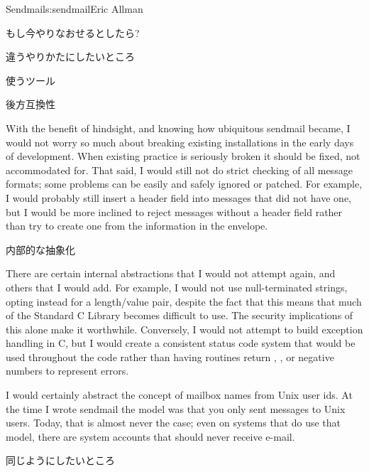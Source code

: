 \begin{aosachapter}{Sendmail}{s:sendmail}{Eric Allman}
\begin{aosasect1}{もし今やりなおせるとしたら?}
\begin{aosasect2}{違うやりかたにしたいところ}
\begin{aosasect3}{使うツール}
\end{aosasect3}

\begin{aosasect3}{後方互換性}

With the benefit of hindsight, and knowing how ubiquitous sendmail
became, I would not worry so much about breaking existing
installations in the early days of development.  When existing
practice is seriously broken it should be fixed, not accommodated
for. That said, I would still not do strict checking of all message
formats; some problems can be easily and safely ignored or
patched. For example, I would probably still insert a 
header field into messages that did not have one, but I would be more
inclined to reject messages without a  header field rather than
try to create one from the information in the envelope.

\end{aosasect3}

\begin{aosasect3}{内部的な抽象化}

There are certain internal abstractions that I would not attempt
again, and others that I would add. For example, I would not use
null-terminated strings, opting instead for a length/value pair,
despite the fact that this means that much of the Standard C Library
becomes difficult to use. The security implications of this alone make
it worthwhile. Conversely, I would not attempt to build exception
handling in C, but I would create a consistent status code system that
would be used throughout the code rather than having routines return
, , or negative numbers to represent errors.

I would certainly abstract the concept of mailbox names from Unix user
ids. At the time I wrote sendmail the model was that you only sent
messages to Unix users. Today, that is almost never the case; even on
systems that do use that model, there are system accounts that should
never receive e-mail.

\end{aosasect3}

\end{aosasect2}

\begin{aosasect2}{同じようにしたいところ}


\end{aosasect2}
\end{aosasect1}
\end{aosachapter}
